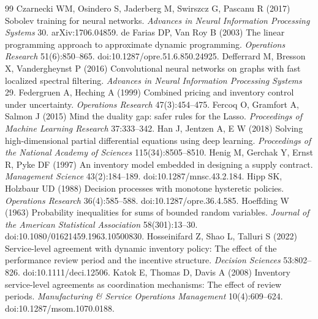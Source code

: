 \documentclass[11pt,letterpaper]{article}
\theoremstyle{definition}
\newcommand{\1}{\mathbf 1}
\begin{document}
\begin{thebibliography}{99}
Czarnecki WM, Osindero S, Jaderberg M, Swirszcz G, Pascanu R (2017) Sobolev training for neural networks. \emph{Advances in Neural Information Processing Systems} 30. arXiv:1706.04859.
de Farias DP, Van Roy B (2003) The linear programming approach to approximate dynamic programming. \emph{Operations Research} 51(6):850--865. doi:10.1287/opre.51.6.850.24925.
Defferrard M, Bresson X, Vandergheynst P (2016) Convolutional neural networks on graphs with fast localized spectral filtering. \emph{Advances in Neural Information Processing Systems} 29.
Federgruen A, Heching A (1999) Combined pricing and inventory control under uncertainty. \emph{Operations Research} 47(3):454--475.
Fercoq O, Gramfort A, Salmon J (2015) Mind the duality gap: safer rules for the Lasso. \emph{Proceedings of Machine Learning Research} 37:333--342.
Han J, Jentzen A, E W (2018) Solving high-dimensional partial differential equations using deep learning. \emph{Proceedings of the National Academy of Sciences} 115(34):8505--8510.
Henig M, Gerchak Y, Ernst R, Pyke DF (1997) An inventory model embedded in designing a supply contract. \emph{Management Science} 43(2):184--189. doi:10.1287/mnsc.43.2.184.
Hipp SK, Holzbaur UD (1988) Decision processes with monotone hysteretic policies. \emph{Operations Research} 36(4):585--588. doi:10.1287/opre.36.4.585.
Hoeffding W (1963) Probability inequalities for sums of bounded random variables. \emph{Journal of the American Statistical Association} 58(301):13--30. doi:10.1080/01621459.1963.10500830.
Hosseinifard Z, Shao L, Talluri S (2022) Service-level agreement with dynamic inventory policy: The effect of the performance review period and the incentive structure. \emph{Decision Sciences} 53:802--826. doi:10.1111/deci.12506.
Katok E, Thomas D, Davis A (2008) Inventory service-level agreements as coordination mechanisms: The effect of review periods. \emph{Manufacturing \& Service Operations Management} 10(4):609--624. doi:10.1287/msom.1070.0188.

\end{thebibliography}
\end{document}
